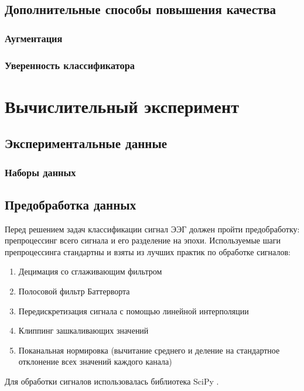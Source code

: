 \documentclass[12pt]{article}
\begin{document}
	
	\subsection{Дополнительные способы повышения качества}
	\subsubsection{Аугментация}
	\subsubsection{Уверенность классификатора}
	
	
	
	\newpage
	\section{Вычислительный эксперимент}
	
	
	
	\subsection{Экспериментальные данные}
	\subsubsection{Наборы данных}
	\subsection{Предобработка данных}
	Перед решением задач классификации сигнал ЭЭГ должен пройти предобработку: препроцессинг всего сигнала и его разделение на эпохи.
	Используемые шаги препроцессинга стандартны и взяты из лучших практик по обработке сигналов:
	\begin{enumerate}
		\item Децимация со сглаживающим фильтром
		\item Полосовой фильтр Баттерворта
		\item Передискретизация сигнала с помощью линейной интерполяции
		\item Клиппинг зашкаливающих значений
		\item Поканальная нормировка (вычитание среднего и деление на стандартное отклонение всех значений каждого канала)
	\end{enumerate}
	
	Для обработки сигналов использовалась библиотека SciPy \cite{SciPy}.
	
\end{document}
